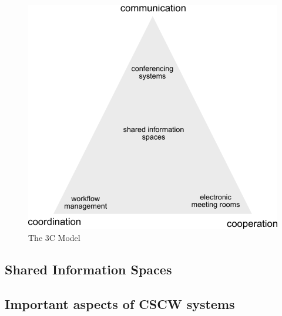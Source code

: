 \begin{figure}[H]
 \centering
 \includegraphics[width=0.8\columnwidth]{images/3C-model.pdf}
 \caption{The 3C Model \citep{Koch2008}}
\label{fig:images_cscw_3C_model}
\end{figure}



\subsection{Shared Information Spaces}
\label{sec:cscw_shared_spaces}


\subsection{Important aspects of CSCW systems}
\label{sec:cscw_req_aspects}


